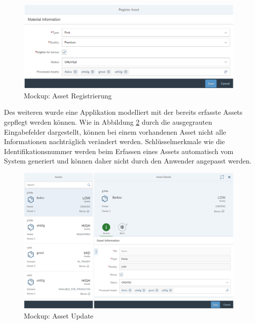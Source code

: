 \begin{figure}[H]
	\centering
	\includegraphics[width=1\linewidth]{pictures/ui-register-asset}
	\caption[Mockup: Asset Registrierung]{Mockup: Asset Registrierung}
	\label{fig:ui-register-asset}
\end{figure}

Des weiteren wurde eine Applikation modelliert mit der bereits erfasste Assets gepflegt werden können. Wie in Abbildung \ref{fig:ui-update-asset} durch die ausgegrauten Eingabefelder dargestellt, können bei einem vorhandenen Asset nicht alle Informationen nachträglich verändert werden. Schlüsselmerkmale wie die Identifikationsnummer werden beim Erfassen eines Assets automatisch vom System generiert und können daher nicht durch den Anwender angepasst werden.

\begin{figure}[H]
	\centering
	\includegraphics[width=1\linewidth]{pictures/ui-update-asset}
	\caption[Mockup: Asset Update]{Mockup: Asset Update}
	\label{fig:ui-update-asset}
\end{figure}

